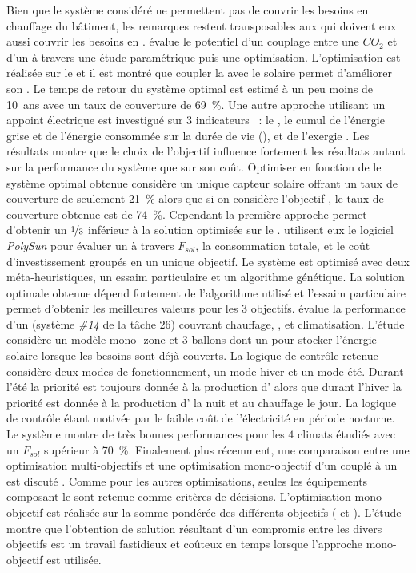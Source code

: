 Bien que le système considéré ne permettent pas de couvrir les besoins en chauffage du
bâtiment, les remarques restent transposables aux  qui doivent eux aussi
couvrir les besoins en .
\textcite{Deng2013212} évalue le potentiel d’un couplage entre une  $CO_{2}$ et
d’un  à travers une étude paramétrique puis une optimisation. L’optimisation est
réalisée sur le  et il est montré que coupler la  avec le
solaire permet d’améliorer son . Le temps de retour du système optimal est estimé
à un peu moins de \SI{10}{ans} avec un taux de couverture de \SI{69}{\percent}. Une autre
approche utilisant un appoint électrique est investigué sur $3$ indicateurs
\parencite{Hin2012,Hin2014102}~:
le , le cumul de l’énergie grise et de l’énergie consommée sur la durée de vie
(), et de l’exergie . Les résultats montre que le choix de l’objectif
influence fortement les résultats autant sur la performance du système que sur son coût.
Optimiser en fonction de  le système optimal obtenue considère un unique capteur
solaire offrant un taux de couverture de seulement \SI{21}{\percent} alors que si on
considère l’objectif , le taux de couverture obtenue est de \SI{74}{\percent}.
Cependant la première approche permet d’obtenir un  $\nicefrac{1}{3}$ inférieur à
la solution optimisée sur le . \textcite{Bornatico201231} utilisent eux le
logiciel \textit{PolySun} pour évaluer un  à travers $F_{sol}$, la
consommation totale, et le coût d’investissement groupés en un unique objectif. Le
système est optimisé avec deux méta-heuristiques, un essaim particulaire et un algorithme
génétique. La solution optimale obtenue dépend fortement de l’algorithme utilisé et
l’essaim particulaire permet d’obtenir les meilleures valeurs pour les $3$ objectifs.
\textcite{Asaee2014510} évalue la performance d’un  (système \emph{\#14} de la tâche
$26$) couvrant chauffage, , et climatisation. L’étude considère un modèle mono-
zone et $3$ ballons dont un pour stocker l’énergie solaire lorsque les besoins sont déjà
couverts. La logique de contrôle retenue considère deux modes de fonctionnement, un mode
hiver et un mode été. Durant l’été la priorité est toujours donnée à la production
d’ alors que durant l’hiver la priorité est donnée à la production d’ la
nuit et au chauffage le jour. La logique de contrôle étant motivée par le faible coût de
l’électricité en période nocturne. Le système montre de très bonnes performances pour les
$4$ climats étudiés avec un $F_{sol}$ supérieur à \SI{70}{\percent}. Finalement
plus récemment, une comparaison entre une optimisation multi-objectifs et une optimisation
mono-objectif d’un  couplé à un  est discuté
\parencite{Rey2016622}. Comme pour les autres optimisations, seules les équipements
composant le  sont retenue comme critères de décisions. L’optimisation mono-
objectif est réalisée sur la somme pondérée des différents objectifs (
et ). L’étude montre que l’obtention de solution résultant d’un compromis entre
les divers objectifs est un travail fastidieux et coûteux en temps lorsque l’approche mono-
objectif est utilisée.


